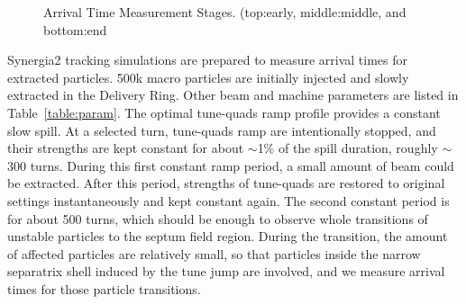 \documentclass[aps,prstab,onecolumn,preprint,endfloats,11pt]{revtex4-1}
\begin{document}
\begin{figure}[!tbp]
  \caption{\label{fig:arrival1}Arrival Time Measurement Stages. (top:early, middle:middle, and bottom:end}
\end{figure}

Synergia2 tracking simulations are prepared to measure arrival times for extracted particles. 500k macro particles are initially injected and slowly extracted in the Delivery Ring. Other beam and machine parameters are listed in Table~\ref{table:param}. The optimal tune-quads ramp profile provides a constant slow spill. At a selected turn, tune-quads ramp are intentionally stopped, and their strengths are kept constant for about $\sim$1\% of the spill duration, roughly $\sim$300 turns. During this first constant ramp period, a small amount of beam could be extracted. After this period, strengths of tune-quads are restored to original settings instantaneously and kept constant again. The second constant period is for about 500 turns, which should be enough to observe whole transitions of unstable particles to the septum field region. During the transition, the amount of affected particles are relatively small, so that particles inside the narrow separatrix shell induced by the tune jump are involved, and we measure arrival times for those particle transitions. 
\end{document}
